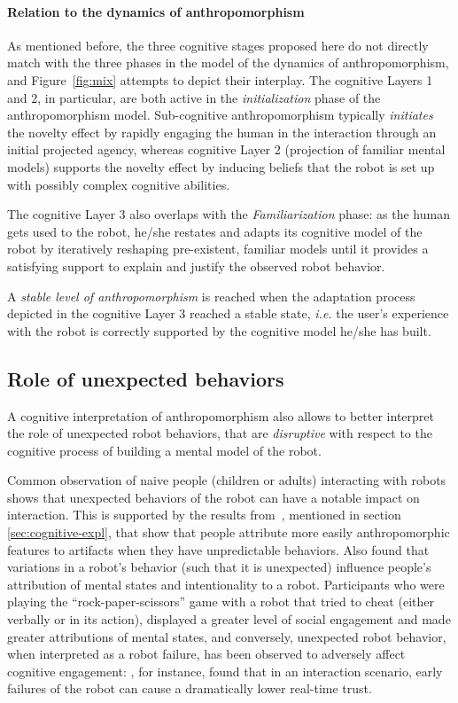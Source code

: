 \documentclass{frontiersSCNS} %
\newcommand{\ie}{\textit{i.e.}\xspace}
\begin{document}
\paragraph{Relation to the dynamics of anthropomorphism\\}

As mentioned before, the three cognitive stages proposed here do not directly
match with the three phases in the model of the dynamics of anthropomorphism,
and Figure~\ref{fig:mix} attempts to depict their interplay.
The cognitive Layers 1 and 2, in particular, are both active in the
\emph{initialization} phase of the anthropomorphism model. Sub-cognitive
anthropomorphism typically \emph{initiates} the novelty effect by rapidly
engaging the human in the interaction through an initial projected agency,
whereas cognitive Layer 2 (projection of familiar mental models) supports the
novelty effect by inducing beliefs that the robot is set up with possibly
complex cognitive abilities.

The cognitive Layer 3 also overlaps with the \emph{Familiarization} phase: as
the human gets used to the robot, he/she restates and adapts its
cognitive model of the robot by iteratively reshaping pre-existent, familiar
models until it provides a satisfying support to explain and justify the
observed robot behavior.

A \emph{stable level of anthropomorphism} is reached when the adaptation process
depicted in the cognitive Layer 3 reached a stable state, \ie the user's
experience with the robot is correctly supported by the cognitive model he/she
has built.


\subsection{Role of unexpected behaviors}
\label{sec:disruptive}

A cognitive interpretation of anthropomorphism also allows to better interpret
the role of unexpected robot behaviors, that are \emph{disruptive} with respect
to the cognitive process of building a mental model of the robot.

Common observation of naive people (children or adults) interacting with robots
shows that unexpected behaviors of the robot can have a notable impact on
interaction. This is supported by the results from~\citet{Waytz2010}, mentioned
in section \ref{sec:cognitive-expl}, that show that people attribute more easily
anthropomorphic features to artifacts when they have unpredictable behaviors.
Also \cite{short_no_2010} found that variations in a robot's behavior (such that
it is unexpected) influence people's attribution of mental states and
intentionality to a robot. Participants who were playing the
``rock-paper-scissors'' game with a robot that tried to cheat (either verbally
or in its action), displayed a greater level of social engagement and made
greater attributions of mental states, and conversely, unexpected robot
behavior, when interpreted as a robot failure, has been observed to adversely
affect cognitive engagement: \cite{desai_impact_2013}, for instance, found that
in an interaction scenario, early failures of the robot can cause a dramatically
lower real-time trust.
\end{document}
